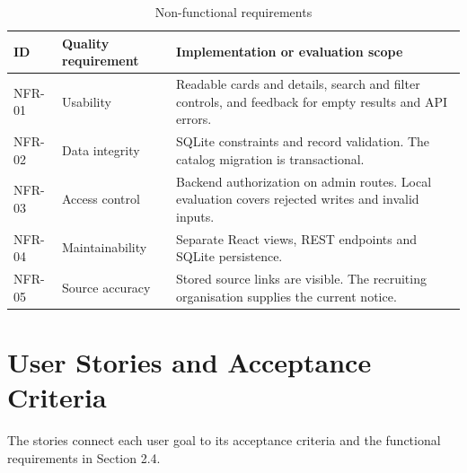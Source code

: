 \documentclass[12pt,a4paper]{report}
\begin{document}
\begin{table}[H]
\centering\small
\begin{tabular}{>{\raggedright\arraybackslash}p{}>{\raggedright\arraybackslash}p{}>{\raggedright\arraybackslash}p{}}
\toprule
\textbf{ID} & \textbf{Quality requirement} & \textbf{Implementation or evaluation scope} \\ \midrule
NFR-01 & Usability & Readable cards and details, search and filter controls, and feedback for empty results and API errors. \\
NFR-02 & Data integrity & SQLite constraints and record validation. The catalog migration is transactional. \\
NFR-03 & Access control & Backend authorization on admin routes. Local evaluation covers rejected writes and invalid inputs. \\
NFR-04 & Maintainability & Separate React views, REST endpoints and SQLite persistence. \\
NFR-05 & Source accuracy & Stored source links are visible. The recruiting organisation supplies the current notice. \\
\bottomrule
\end{tabular}
\setcounter{table}{5}
\caption{Non-functional requirements}
\end{table}

\clearpage

\section{User Stories and Acceptance Criteria}

The stories connect each user goal to its acceptance criteria and the functional requirements in Section 2.4.
\end{document}
